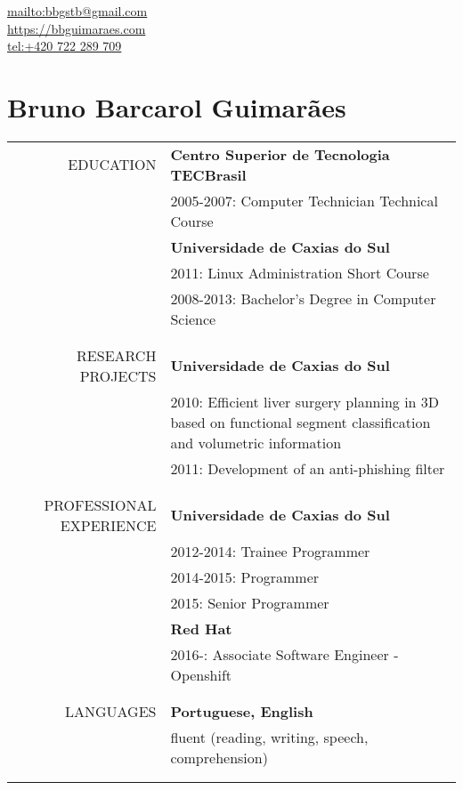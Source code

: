 \begin{flushright}
    \url{mailto:bbgstb@gmail.com} \\
    \url{https://bbguimaraes.com} \\
    \url{tel:+420 722 289 709}
\end{flushright}

\vspace{-\baselineskip}
\section*{Bruno Barcarol Guimarães}
\bigskip

\begin{tabular}{rp{12cm}}
    \uppercase{Education}
    & \textbf{Centro Superior de Tecnologia TECBrasil} \\
    & 2005-2007: Computer Technician Technical Course \\
    & \textbf{Universidade de Caxias do Sul} \\
    & 2011: Linux Administration Short Course \\
    & 2008-2013: Bachelor's Degree in Computer Science
    \\\\ \hline \\
    \uppercase{Research projects}
    & \textbf{Universidade de Caxias do Sul} \\
    & 2010:
        Efficient liver surgery planning in 3D based on functional segment
        classification and volumetric information \\
    & 2011: Development of an anti-phishing filter
    \\\\ \hline \\
    \uppercase{Professional experience}
    & \textbf{Universidade de Caxias do Sul} \\
    & 2012-2014: Trainee Programmer \\
    & 2014-2015: Programmer \\
    & 2015: Senior Programmer \\
    & \textbf{Red Hat} \\
    & 2016-: Associate Software Engineer - Openshift
    \\\\ \hline \\
    \uppercase{Languages}
    & \textbf{Portuguese, English} \\
    & fluent (reading, writing, speech, comprehension)
    \\\\ \hline \\

\end{tabular}
